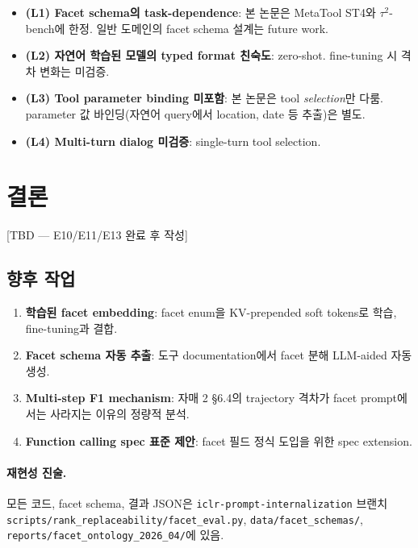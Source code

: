 \documentclass[11pt]{article}
\theoremstyle{plain}
\theoremstyle{definition}
\theoremstyle{remark}
\begin{document}
\begin{itemize}[leftmargin=*, itemsep=2pt]
\item \textbf{(L1) Facet schema의 task-dependence}: 본 논문은 MetaTool ST4와 $\tau^2$-bench에 한정. 일반 도메인의 facet schema 설계는 future work.
\item \textbf{(L2) 자연어 학습된 모델의 typed format 친숙도}: zero-shot. fine-tuning 시 격차 변화는 미검증.
\item \textbf{(L3) Tool parameter binding 미포함}: 본 논문은 tool \emph{selection}만 다룸. parameter 값 바인딩(자연어 query에서 location, date 등 추출)은 별도.
\item \textbf{(L4) Multi-turn dialog 미검증}: single-turn tool selection.
\end{itemize}

\section{결론}
\label{sec:conclusion}

[TBD — E10/E11/E13 완료 후 작성]

\subsection*{향후 작업}
\label{sec:future-work}

\begin{enumerate}[leftmargin=*, itemsep=2pt]
\item \textbf{학습된 facet embedding}: facet enum을 KV-prepended soft tokens로 학습, fine-tuning과 결합.
\item \textbf{Facet schema 자동 추출}: 도구 documentation에서 facet 분해 LLM-aided 자동 생성.
\item \textbf{Multi-step F1 mechanism}: 자매 2 §6.4의 trajectory 격차가 facet prompt에서는 사라지는 이유의 정량적 분석.
\item \textbf{Function calling spec 표준 제안}: facet 필드 정식 도입을 위한 spec extension.
\end{enumerate}

\paragraph{재현성 진술.}
모든 코드, facet schema, 결과 JSON은 \texttt{iclr-prompt-internalization} 브랜치 \texttt{scripts/rank\_replaceability/facet\_eval.py}, \texttt{data/facet\_schemas/}, \texttt{reports/facet\_ontology\_2026\_04/}에 있음.


\end{document}
